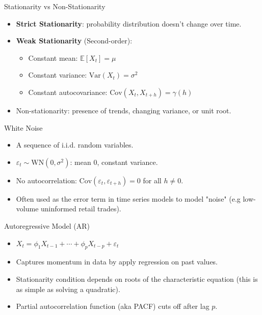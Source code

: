 \documentclass{beamer}
\begin{document}
	
	\begin{frame}{Stationarity vs Non-Stationarity}
		\begin{itemize}
			\item \textbf{Strict Stationarity}: probability distribution doesn't change over time.
			\item \textbf{Weak Stationarity} (Second-order):
			\begin{itemize}
				\item Constant mean: \( \mathbb{E}[X_t] = \mu \)
				\item Constant variance: \( \text{Var}(X_t) = \sigma^2 \)
				\item Constant autocovariance: \( \text{Cov}(X_t, X_{t+h}) = \gamma(h) \)
			\end{itemize}
			\item Non-stationarity: presence of trends, changing variance, or unit root.
		\end{itemize}
	\end{frame}
	
	\begin{frame}{White Noise}
		\begin{itemize}
			\item A sequence of i.i.d. random variables.
			\item \( \varepsilon_t \sim \text{WN}(0, \sigma^2) \): mean 0, constant variance.
			\item No autocorrelation: \( \text{Cov}(\varepsilon_t, \varepsilon_{t+h}) = 0 \) for all \( h \neq 0 \).
			\item Often used as the error term in time series models to model "noise" (e.g low-volume uninformed retail trades).
		\end{itemize}
	\end{frame}
	
	\begin{frame}{Autoregressive Model (AR)}
		\begin{itemize}
			\item \( X_t = \phi_1 X_{t-1} + \cdots + \phi_p X_{t-p} + \varepsilon_t \)
			\item Captures momentum in data by apply regression on past values.
			\item Stationarity condition depends on roots of the characteristic equation (this is as simple as solving a quadratic).
			\item Partial autocorrelation function (aka PACF) cuts off after lag \( p \).
		\end{itemize}
	\end{frame}
	
\end{document}
